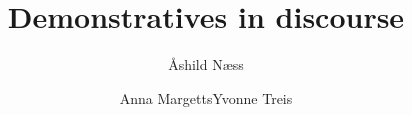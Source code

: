 \renewcommand{\lsSeries}{tgdi}
\renewcommand{\lsSeriesNumber}{}

\title{Demonstratives in discourse}
\subtitle{}
\author{Åshild Næss\and Anna Margetts\lastand Yvonne Treis}


